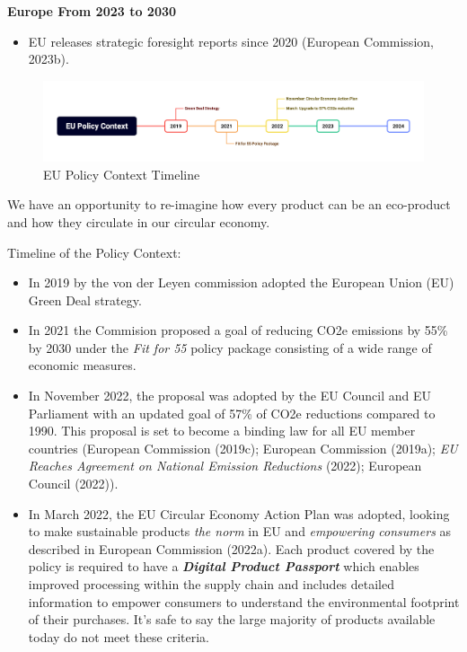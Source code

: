 \documentclass[
  letterpaper,
  DIV=11,
  numbers=noendperiod]{scrartcl}
\providecommand{\tightlist}{%
  \setlength{\itemsep}{0pt}\setlength{\parskip}{0pt}}\usepackage{longtable,booktabs,array}
\begin{document}
\textbf{Europe From 2023 to 2030}

\begin{itemize}
\tightlist
\item
  EU releases strategic foresight reports since 2020 (European
  Commission, 2023b).
\end{itemize}

\begin{figure}[H]

{\centering \includegraphics[width=1\linewidth,height=\textheight,keepaspectratio]{./images/sustainability/eu-policy-context.png}

}

\caption{EU Policy Context Timeline}

\end{figure}%

We have an opportunity to re-imagine how every product can be an
eco-product and how they circulate in our circular economy.

Timeline of the Policy Context:

\begin{itemize}
\item
  In 2019 by the von der Leyen commission adopted the European Union
  (EU) Green Deal strategy.
\item
  In 2021 the Commision proposed a goal of reducing CO2e emissions by
  55\% by 2030 under the \emph{Fit for 55} policy package consisting of
  a wide range of economic measures.
\item
  In November 2022, the proposal was adopted by the EU Council and EU
  Parliament with an updated goal of 57\% of CO2e reductions compared to
  1990. This proposal is set to become a binding law for all EU member
  countries (European Commission (2019c); European Commission (2019a);
  \emph{{EU} Reaches Agreement on National Emission Reductions} (2022);
  European Council (2022)).
\item
  In March 2022, the EU Circular Economy Action Plan was adopted,
  looking to make sustainable products \emph{the norm} in EU and
  \emph{empowering consumers} as described in European Commission
  (2022a). Each product covered by the policy is required to have a
  \textbf{\emph{Digital Product Passport}} which enables improved
  processing within the supply chain and includes detailed information
  to empower consumers to understand the environmental footprint of
  their purchases. It's safe to say the large majority of products
  available today do not meet these criteria.
\end{itemize}
\end{document}

